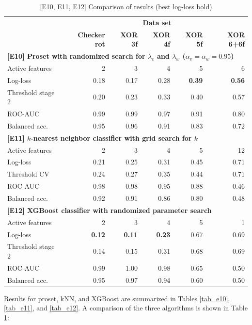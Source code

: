 %
\begin{table}
\caption{[E10, E11, E12] Comparison of results (best log-loss bold)}
\label{tab_e10_e11_e12}
%
\begin{center}
\small
\begin{tabular}{|lrrrrr|}
\hline
&\multicolumn{5}{c|}{\textbf{\hrulefill\ Data set \hrulefill}}\\
&\textbf{Checker rot}&\textbf{XOR 3f}&\textbf{XOR 4f}&\textbf{XOR 5f}&\textbf{XOR 6+6f}\\
\multicolumn{6}{|l|}{\textbf{[E10] Proset with randomized search for $\lambda_v$ and $\lambda_w$ ($\alpha_v=\alpha_w=0.95$)}}\\
Active features&2&3&4&5&6\\
Log-loss&0.18&0.17&0.28&\textbf{0.39}&\textbf{0.56}\\
Threshold stage 2&0.20&0.23&0.33&0.40&0.57\\
ROC-AUC&0.99&0.99&0.97&0.91&0.80\\
Balanced acc.&0.95&0.96&0.91&0.83&0.72\\
\multicolumn{6}{|l|}{\textbf{[E11] $k$-nearest neighbor classifier with grid search for $k$}}\\
Active features&2&3&4&5&12\\
Log-loss&0.21&0.25&0.31&0.45&0.71\\
Threshold CV&0.24&0.27&0.35&0.44&0.71\\
ROC-AUC&0.98&0.98&0.95&0.88&0.46\\
Balanced acc.&0.92&0.91&0.86&0.80&0.48\\
\multicolumn{6}{|l|}{\textbf{[E12] XGBoost classifier with randomized parameter search}}\\
Active features&2&3&4&5&1\\
Log-loss&\textbf{0.12}&\textbf{0.11}&\textbf{0.23}&0.67&0.69\\
Threshold stage 2&0.14&0.15&0.31&0.68&0.69\\
ROC-AUC&0.99&1.00&0.98&0.65&0.50\\
Balanced acc.&0.95&0.97&0.94&0.60&0.50\\
\hline
\end{tabular}
\end{center}
\end{table}
%
\clearpage
%
Results for proset, kNN, and XGBoost are summarized in Tables \ref{tab_e10}, \ref{tab_e11}, and \ref{tab_e12}.
A comparison of the three algorithms is shown in Table \ref{tab_e10_e11_e12}:
%
